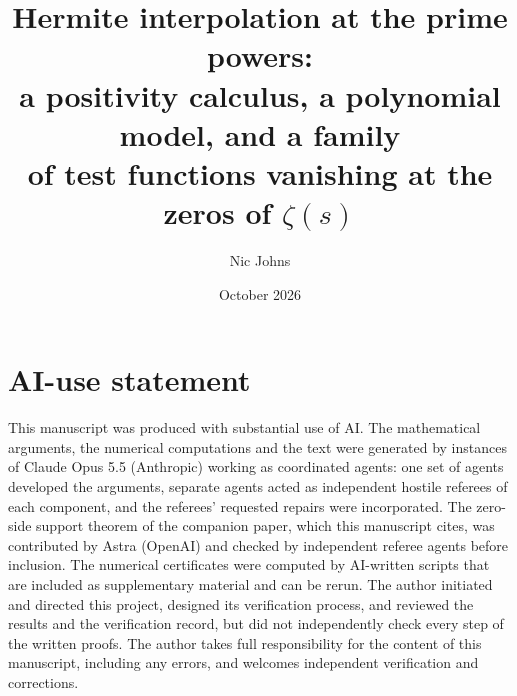 \documentclass[11pt]{amsart}
\title[Hermite interpolation at the prime powers]{Hermite interpolation at the prime powers:\\
a positivity calculus, a polynomial model, and a family\\ of test functions vanishing at the zeros of $\zeta(s)$}
\author{Nic Johns}
\date{October 2026}
\theoremstyle{definition}
\theoremstyle{remark}
\numberwithin{equation}{section}
\theoremstyle{plain}
\newcommand{\inputsection}[1]{}
\begin{document}
\begin{abstract}

\end{abstract}

\maketitle

\setcounter{tocdepth}{1}
\tableofcontents

\inputsection{01-intro}
\inputsection{02-setting}
\inputsection{03-nested}
\inputsection{04-chain}
\inputsection{05-model}
\inputsection{06-model-chain}
\inputsection{07-model-tail}
\inputsection{08-signW}
\inputsection{09-true}
\inputsection{10-observations}
\inputsection{11-conjectures}

\section*{AI-use statement}
This manuscript was produced with substantial use of AI. The mathematical arguments, the numerical computations and the text were generated by instances of Claude Opus 5.5
(Anthropic) working as coordinated agents: one set of agents developed the arguments, separate agents acted as
independent hostile referees of each component, and the referees' requested repairs were incorporated. The zero-side support
theorem of the companion paper, which this manuscript cites, was contributed by Astra (OpenAI) and checked by independent referee
agents before inclusion. The numerical
certificates were computed by AI-written scripts that are included as supplementary material and can be rerun. The
author initiated and directed this project, designed its verification process, and reviewed the results and the
verification record, but did not independently check every step of the written proofs. The author takes full
responsibility for the content of this manuscript, including any errors, and welcomes independent verification and
corrections.

\appendix
\inputsection{A-proofs}
\inputsection{B-certificates}
\inputsection{C-anc}



\end{document}
